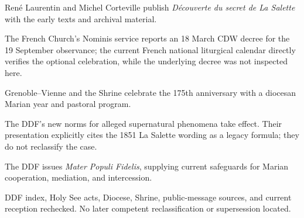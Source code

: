 \begin{description}[style=nextline,leftmargin=1.5em,labelsep=0.35em,itemsep=0.35em]
  \item[2002] René Laurentin and Michel Corteville publish \emph{Découverte du secret de La Salette} with the early texts and archival material.
  \item[2016] The French Church's Nominis service reports an 18 March CDW decree for the 19 September observance; the current French national liturgical calendar directly verifies the optional celebration, while the underlying decree was not inspected here.
  \item[2021] Grenoble--Vienne and the Shrine celebrate the 175th anniversary with a diocesan Marian year and pastoral program.
  \item[19 May 2024] The DDF's new norms for alleged supernatural phenomena take effect. Their presentation explicitly cites the 1851 La Salette wording as a legacy formula; they do not reclassify the case.
  \item[4 November 2025] The DDF issues \emph{Mater Populi Fidelis}, supplying current safeguards for Marian cooperation, mediation, and intercession.
  \item[16 July 2026] DDF index, Holy See acts, Diocese, Shrine, public-message sources, and current reception rechecked. No later competent reclassification or supersession located.
\end{description}
\endgroup
